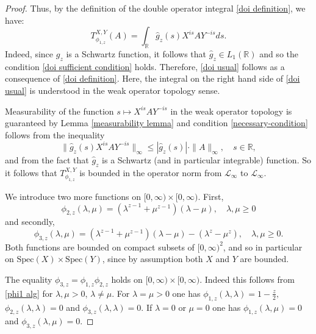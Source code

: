 \begin{proof}
        Thus, by the definition of the double operator integral \eqref{doi definition}, we have:
        \begin{equation}\label{doi usual}
            T_{\phi_{1,z}}^{X,Y}(A)=\int_{\mathbb{R}}\widehat{g}_z(s)X^{is}AY^{-is}ds.
        \end{equation}
        Indeed, since $g_z$ is a Schwartz function, it follows that $\widehat{g}_z\in L_1(\mathbb{R})$ and so the condition \eqref{doi sufficient condition} holds. Therefore, \eqref{doi usual} follows as a consequence of \eqref{doi definition}.
        Here, the integral on the right hand side of \eqref{doi usual} is understood in the weak operator topology sense.
        
        Measurability of the function $s\mapsto X^{is}AY^{-is}$ in the weak operator topology is guaranteed by Lemma \ref{measurability lemma} and condition \eqref{necessary-condition} follows from the inequality
        $$\|\widehat{g}_z(s)X^{is}AY^{-is}\|_{\infty}\leq|\widehat{g}_z(s)|\cdot\|A\|_{\infty},\quad s\in\mathbb{R},$$
        and from the fact that $\widehat{g}_z$ is a Schwartz (and in particular integrable) function. So it follows that $T^{X,Y}_{\phi_{1,z}}$ is bounded in the operator norm from $\mathcal{L}_{\infty}$ to $\mathcal{L}_{\infty}.$
        
        We introduce two more functions on $[0,\infty)\times [0,\infty)$. First,
        \begin{equation*}
            \phi_{2,z}(\lambda,\mu) = (\lambda^{z-1}+\mu^{z-1})(\lambda-\mu),\quad\lambda,\mu\geq0
        \end{equation*}
        and secondly,
        \begin{equation*}
            \phi_{3,z}(\lambda,\mu) = (\lambda^{z-1}+\mu^{z-1})(\lambda-\mu)-(\lambda^z-\mu^z),\quad  \lambda,\mu\geq 0.
        \end{equation*}
        Both functions are bounded on compact subsets of $[0,\infty)^2$, and so in particular on $\mathrm{Spec}(X)\times \mathrm{Spec}(Y)$, since
        by assumption both $X$ and $Y$ are bounded.
        
        The equality $\phi_{3,z}=\phi_{1,z}\phi_{2,z}$ holds on $[0,\infty)\times [0,\infty)$. 
        Indeed this follows from \eqref{phi1 alg} for $\lambda,\mu>0$, $\lambda\neq \mu.$ For $\lambda=\mu>0$ one has $\phi_{1,z}(\lambda,\lambda)=1-\frac{z}{2},$  $\phi_{2,z}(\lambda,\lambda)=0$ and $\phi_{3,z}(\lambda,\lambda)=0.$ If $\lambda=0$ or $\mu=0$ one has $\phi_{1,z}(\lambda,\mu)=0$ and $\phi_{3,z}(\lambda,\mu)=0.$


\end{proof}
